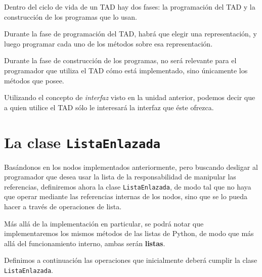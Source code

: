 Dentro del ciclo de vida de un TAD hay dos fases: la programación del TAD y
la construcción de los programas que lo usan.

Durante la fase de programación del TAD, habrá que elegir una
representación, y luego programar cada uno de los métodos sobre esa
representación.

Durante la fase de construcción de los programas, no será relevante para el
programador que utiliza el TAD cómo está implementado, sino únicamente los
métodos que posee.

\begin{observacion}
Utilizando el concepto de \emph{interfaz} visto en la unidad anterior, podemos
decir que a quien utilice el TAD sólo le interesará la interfaz que éste
ofrezca.
\end{observacion}

\section{La clase {\tt ListaEnlazada}}

Basándonos en los nodos implementados anteriormente, pero buscando
desligar al programador que desea usar la lista de la responsabilidad de
manipular las referencias, definiremos ahora la clase
\lstinline!ListaEnlazada!, de modo tal que no haya que operar mediante las
referencias internas de los nodos, sino que se lo pueda hacer a través de
operaciones de lista.

Más allá de la implementación en particular, se podrá notar que implementaremos
los mismos métodos de las listas de Python, de modo que más allá del
funcionamiento interno, ambas serán {\bf listas}.

Definimos a continuación las operaciones que inicialmente deberá cumplir la
clase \lstinline!ListaEnlazada!.

